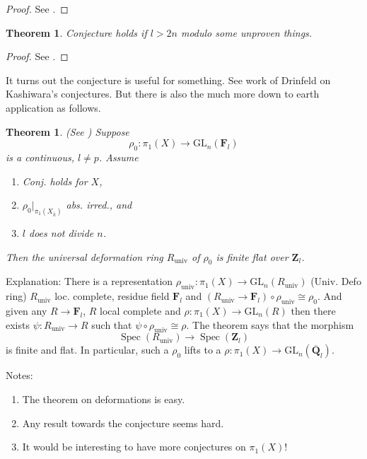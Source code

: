 \documentclass{stacks-project}
\theoremstyle{plain}
\newtheorem{theorem}[subsection]{Theorem}
\theoremstyle{definition}
\theoremstyle{remark}
\numberwithin{equation}{subsection}
\def\Spec{\mathop{\mathrm{Spec}}}
\begin{document}
\begin{proof}
See \cite{dJ-conjecture}.
\end{proof}

\begin{theorem}
\label{theorem-conjecture-l-bigger-2n}
Conjecture holds if $l > 2n$ modulo some unproven things.
\end{theorem}

\begin{proof}
See \cite{Gaitsgory}.
\end{proof}

\noindent
It turns out the conjecture is useful for something.
See work of Drinfeld on Kashiwara's conjectures. But there is also
the much more down to earth application as follows.

\begin{theorem}
\label{theorem-deformation-rings}
(See \cite[Theorem 3.5]{dJ-conjecture})
Suppose
$$
\rho_0: \pi_1(X)\to \text{GL}_n(\mathbf{F}_l)
$$
is a continuous, $l\neq p$. Assume
\begin{enumerate}
\item Conj. holds for $X$,
\item $\rho_0 |_{\pi_1(X_{\overline{k}})}$ abs. irred., and
\item $l$ does not divide $n$.
\end{enumerate}
Then the universal deformation ring $R_{\text{univ}}$ of $\rho_0$ is
finite flat over $\mathbf{Z}_l$.
\end{theorem}

\noindent
Explanation: There is a representation $\rho_{\text{univ}}:
\pi_1(X)\to \text{GL}_n(R_{\text{univ}})$ (Univ. Defo ring)
$R_{\text{univ}}$ loc.
complete, residue field $\mathbf{F}_l$ and $(R_{\text{univ}}\to
\mathbf{F}_l)\circ\rho_{\text{univ}}\cong\rho_0$.
And given any $R\to \mathbf{F}_l$, $R$ local complete and
$\rho : \pi_1(X)\to \text{GL}_n(R)$ then there exists
$\psi : R_{\text{univ}}\to R$ such that
$\psi\circ\rho_{\text{univ}}\cong \rho$. The theorem says that the morphism
$$
\Spec(R_{\text{univ}})
\longrightarrow
\Spec(\mathbf{Z}_l)
$$
is finite and flat. In particular, such a $\rho_0$
lifts to a $\rho : \pi_1(X) \to \text{GL}_n(\overline{\mathbf{Q}}_l)$.

\medskip\noindent
Notes:
\begin{enumerate}
\item The theorem on deformations is easy.
\item Any result towards the conjecture seems hard.
\item It would be interesting to have more conjectures on $\pi_1(X)$!
\end{enumerate}
\end{document}
